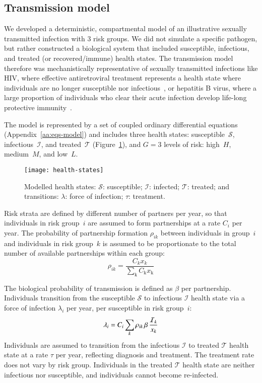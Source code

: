 \subsection{Transmission model}\label{ss:model-sim}
We developed a deterministic, compartmental model of an illustrative
sexually transmitted infection with 3 risk groups.
We did not simulate a specific pathogen, but rather constructed a biological system
that included susceptible, infectious, and treated (or recovered/immune) health states.
The transmission model therefore was mechanistically representative of
sexually transmitted infections like
HIV, where effective antiretroviral treatment represents a health state where
individuals are no longer susceptible nor infectious~\citep{Maartens2014}, or
hepatitis B virus, where a large proportion of individuals who clear their acute infection
develop life-long protective immunity~\citep{Ganem2004}.
\par
The model is represented by a set of coupled ordinary differential equations
(Appendix~\ref{aa:eqs-model}) and includes
three health states:
susceptible~$\mathcal{S}$, infectious~$\mathcal{I}$, and treated~$\mathcal{T}$
(Figure~\ref{fig:health-states}),
and $G = 3$ levels of risk:
high~$H$, medium~$M$, and low~$L$.
\begin{figure}
  \centering
  \texttt{[image: health-states]}
  \caption{Modelled health states:
    $\mathcal{S}$: susceptible;
    $\mathcal{I}$: infected;
    $\mathcal{T}$: treated;
    and transitions:
    $\lambda$: force of infection;
    $\tau$: treatment.}
  \label{fig:health-states}
\end{figure}
Risk strata are defined by different number of partners per year,
so that individuals in risk group~$i$ are assumed to
form partnerships at a rate $C_{i}$ per year.
The probability of partnership formation $\rho_{ik}$ between individuals in group~$i$
and individuals in risk group~$k$ is assumed to be
proportionate to the total number of available partnerships within each group:
\begin{equation}
\rho_{ik} = \frac
{C_k x_k}
{\sum_{\mathrm{k}}C_{\mathrm{k}} x_{\mathrm{k}}}
\label{eq:rho}
\end{equation}
\par
The biological probability of transmission is defined as $\beta$ per partnership.
Individuals transition from the
susceptible $\mathcal{S}$ to infectious $\mathcal{I}$ health state
via a force of infection $\lambda_i$ per year, per susceptible in risk group~$i$:
\begin{equation}
\lambda_{i} =
C_{i} \sum_k \rho_{ik} \thinspace  \beta \thinspace \frac{\mathcal{I}_k}{x_k}
\label{eq:foi}
\end{equation}
Individuals are assumed to transition from the
infectious $\mathcal{I}$ to treated $\mathcal{T}$ health state
at a rate $\tau$ per year, reflecting diagnosis and treatment.
The treatment rate does not vary by risk group.
Individuals in the treated $\mathcal{T}$ health state are neither infectious nor susceptible,
and individuals cannot become re-infected.

